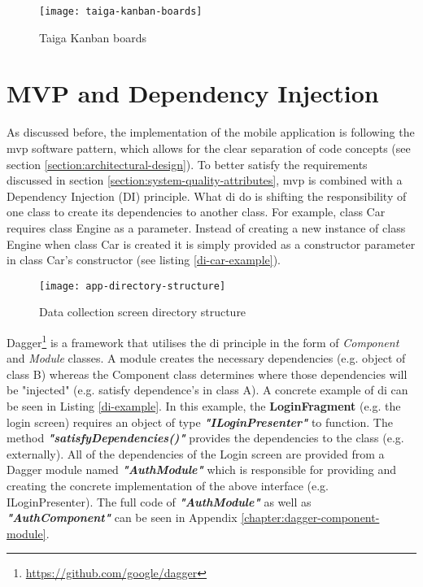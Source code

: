 \begin{figure}[ht]
    \centering
    \texttt{[image: taiga-kanban-boards]}
    \caption{Taiga Kanban boards}
    \label{fig:taiga-kanban-boards}
\end{figure}

\section{MVP and Dependency Injection}
    As discussed before, the implementation of the mobile application is following the \gls{mvp} software pattern, which allows for the clear separation of code concepts (see section \ref{section:architectural-design}). To better satisfy the requirements discussed in section \ref{section:system-quality-attributes}, \gls{mvp} is combined with a Dependency Injection (DI) principle. What \gls{di} do is shifting the responsibility of one class to create its dependencies to another class. For example, class Car requires class Engine as a parameter. Instead of creating a new instance of class Engine when class Car is created it is simply provided as a constructor parameter in class Car's constructor (see listing \ref{di-car-example}).
    
     \begin{wrapfigure}{RI}{0.3\textwidth}
        \begin{center}
            \texttt{[image: app-directory-structure]}
        \end{center}
    \caption{Data collection screen directory structure}
    \label{fig:app-directory-structure}
    \end{wrapfigure}
    
    Dagger\footnote{\url{https://github.com/google/dagger}} is a framework that utilises the \gls{di} principle in the form of \textit{Component} and \textit{Module} classes. A module creates the necessary dependencies (e.g. object of class B) whereas the Component class determines where those dependencies will be "injected" (e.g. satisfy dependence's in class A). A concrete example of \gls{di} can be seen in Listing \ref{di-example}. In this example, the \textbf{LoginFragment} (e.g. the login screen) requires an object of type \textit{\textbf{"ILoginPresenter"}} to function. The method \textit{\textbf{"satisfyDependencies()"}} provides the dependencies to the class (e.g. externally). All of the dependencies of the Login screen are provided from a Dagger module named \textit{\textbf{"AuthModule"}} which is responsible for providing and creating the concrete implementation of the above interface (e.g. ILoginPresenter). The full code of \textit{\textbf{"AuthModule"}} as well as \textit{\textbf{"AuthComponent"}} can be seen in Appendix \ref{chapter:dagger-component-module}.  
    
